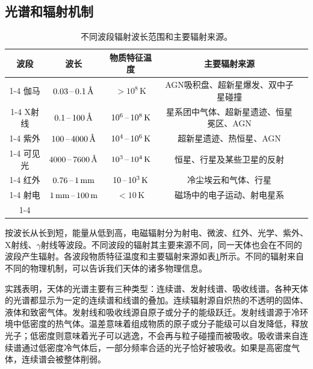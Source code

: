 \documentclass[../天体物理基础.tex]{subfiles}
\begin{document}
\subsection{光谱和辐射机制}
\begin{table}[!htbp]
\centering
\caption{不同波段辐射波长范围和主要辐射来源。}
\begin{tabular}{c c c c c}
\hline
波段 & 波长 & 物质特征温度 & 主要辐射来源\\
\cline{1-4}
伽马 & $0.03\,\text{\textendash}\,0.1\,\si{\angstrom}$ & $>10^{8}\,\mathrm{K}$ & AGN吸积盘、超新星爆发、双中子星碰撞\\
\cline{1-4}
X射线 & $0.1\,\text{\textendash}\,100\,\si{\angstrom}$ & $10^{6}\,\text{\textendash}\,10^{8}\,\mathrm{K}$ & 星系团中气体、超新星遗迹、恒星冕区、AGN\\
\cline{1-4}
紫外 & $100\,\text{\textendash}\,4000\,\si{\angstrom}$ & $10^{4}\,\text{\textendash}\,10^{6}\,\mathrm{K}$ & 超新星遗迹、热恒星、AGN\\
\cline{1-4}
可见光 & $4000\,\text{\textendash}\,7600\,\si{\angstrom}$ & $10^{3}\,\text{\textendash}\,10^{4}\,\mathrm{K}$ & 恒星、行星及某些卫星的反射\\
\cline{1-4}
红外 & $0.76\,\text{\textendash}\,1\,\mathrm{mm}$ & $10\,\text{\textendash}\,10^{3}\,\mathrm{K}$ & 冷尘埃云和气体、行星\\
\cline{1-4}
射电 & $1\,\mathrm{mm}\,\text{\textendash}\,100\,\mathrm{m}$ & $<10\,\mathrm{K}$ & 磁场中的电子运动、射电星系\\
\cline{1-4}
\end{tabular}
\label{不同波段辐射波长范围和主要辐射来源。}
\end{table}

按波长从长到短，能量从低到高，电磁辐射分为射电、微波、红外、光学、紫外、X射线、$\gamma$射线等波段。不同波段的辐射其主要来源不同，同一天体也会在不同的波段产生辐射。各波段物质特征温度和主要辐射来源如表\ref{不同波段辐射波长范围和主要辐射来源。}所示。不同的辐射来自不同的物理机制，可以告诉我们天体的诸多物理信息。

实践表明，天体的光谱主要有三种类型：连续谱、发射线谱、吸收线谱。各种天体的光谱都显示为一定的连续谱和线谱的叠加。连续辐射源自炽热的不透明的固体、液体和致密气体。发射线和吸收线源自原子或分子的能级跃迁。发射线谱源于冷环境中低密度的热气体。温差意味着组成物质的原子或分子能级可以自发降低，释放光子；低密度则意味着光子可以逃逸，不会再与粒子碰撞而被吸收。吸收谱来自连续谱通过低密度冷气体后，一部分频率合适的光子恰好被吸收。如果是高密度气体，连续谱会被整体削弱。
\end{document}
